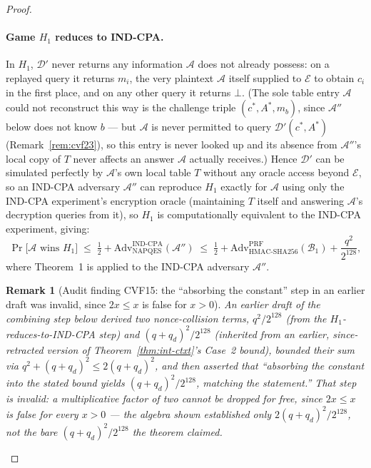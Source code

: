 \documentclass[11pt,a4paper]{article}
\newtheorem{remark}[theorem]{Remark}
\begin{document}
\begin{proof}
\paragraph{Game $H_1$ reduces to IND-CPA.}
In $H_1$, $\mathcal{D}'$ never returns any information $\mathcal{A}$ does
not already possess: on a replayed query it returns $m_i$, the very
plaintext $\mathcal{A}$ itself supplied to $\mathcal{E}$ to obtain $c_i$
in the first place, and on any other query it returns $\bot$. (The sole
table entry $\mathcal{A}$ could not reconstruct this way is the challenge
triple $(c^*,A^*,m_b)$, since $\mathcal{A}''$ below does not know $b$ ---
but $\mathcal{A}$ is never permitted to query $\mathcal{D}'(c^*,A^*)$
(Remark~\ref{rem:cvf23}), so this entry is never looked up and its
absence from $\mathcal{A}''$'s local copy of $T$ never affects an answer
$\mathcal{A}$ actually receives.) Hence $\mathcal{D}'$ can be simulated
perfectly by $\mathcal{A}$'s own local table $T$ without any oracle
access beyond $\mathcal{E}$, so an IND-CPA adversary $\mathcal{A}''$ can
reproduce $H_1$ exactly for $\mathcal{A}$ using only the IND-CPA
experiment's encryption oracle (maintaining $T$ itself and answering
$\mathcal{A}$'s decryption queries from it), so
$H_1$ is computationally equivalent to the IND-CPA experiment, giving:
\[
  \Pr\bigl[\mathcal{A}\text{ wins }H_1\bigr]
  \;\leq\;
  \tfrac{1}{2}
  + \mathrm{Adv}^{\mathrm{IND\text{-}CPA}}_{\mathrm{NAPQES}}(\mathcal{A}'')
  \;\leq\;
  \tfrac{1}{2}
  + \mathrm{Adv}^{\mathrm{PRF}}_{\mathrm{HMAC\text{-}SHA256}}(\mathcal{B}_1)
  + \frac{q^2}{2^{128}},
\]
where Theorem~1 is applied to the IND-CPA adversary $\mathcal{A}''$.

\begin{remark}[Audit finding CVF15: the ``absorbing the constant'' step in an earlier draft was invalid, since $2x \leq x$ is false for $x>0$]
\label{rem:cvf15}
An earlier draft of the combining step below derived two nonce-collision
terms, $q^2/2^{128}$ (from the $H_1$-reduces-to-IND-CPA step) and
$(q+q_d)^2/2^{128}$ (inherited from an earlier, since-retracted version of
Theorem~\ref{thm:int-ctxt}'s Case~2 bound), bounded their sum via
$q^2+(q+q_d)^2 \leq 2(q+q_d)^2$, and then asserted that ``absorbing the
constant into the stated bound yields $(q+q_d)^2/2^{128}$, matching the
statement.'' That step is invalid: a multiplicative factor of two cannot
be dropped for free, since $2x \leq x$ is false for every $x>0$ --- the
algebra shown established only $2(q+q_d)^2/2^{128}$, not the bare
$(q+q_d)^2/2^{128}$ the theorem claimed.


\end{remark}
\end{proof}
\end{document}
